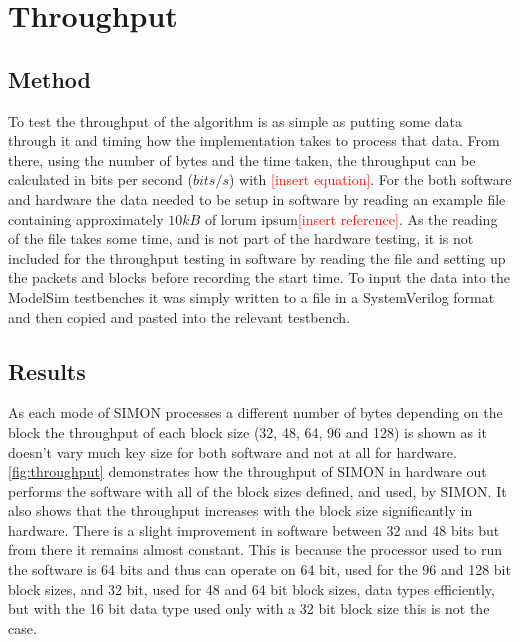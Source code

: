\documentclass[12pt,twoside,a4paper]{report}
\begin{document}
	\section{Throughput}
	
	\subsection{Method}
	To test the throughput of the algorithm is as simple as putting some data through it and timing how the implementation takes to process that data. From there, using the number of bytes and the time taken, the throughput can be calculated in bits per second ($bits/s$) with \textcolor{red}{[insert equation]}. For the both software and hardware the data needed to be setup in software by reading an example file containing approximately $10kB$ of lorum ipsum\textcolor{red}{[insert reference]}. As the reading of the file takes some time, and is not part of the hardware testing, it is not included for the throughput testing in software by reading the file and setting up the packets and blocks before recording the start time. To input the data into the ModelSim testbenches it was simply written to a file in a SystemVerilog format and then copied and pasted into the relevant testbench.
	
	\subsection{Results}
	
	As each mode of SIMON processes a different number of bytes depending on the block the throughput of each block size (32, 48, 64, 96 and 128) is shown as it doesn't vary much key size for both software and not at all for hardware. \autoref{fig:throughput} demonstrates how the throughput of SIMON in hardware out performs the software with all of the block sizes defined, and used, by SIMON. It also shows that the throughput increases with the block size significantly in hardware. There is a slight improvement in software between 32 and 48 bits but from there it remains almost constant. This is because the processor used to run the software is 64 bits and thus can operate on 64 bit, used for the 96 and 128 bit block sizes, and 32 bit, used for 48 and 64 bit block sizes, data types efficiently, but with the 16 bit data type used only with a 32 bit block size this is not the case.
	
\end{document}
